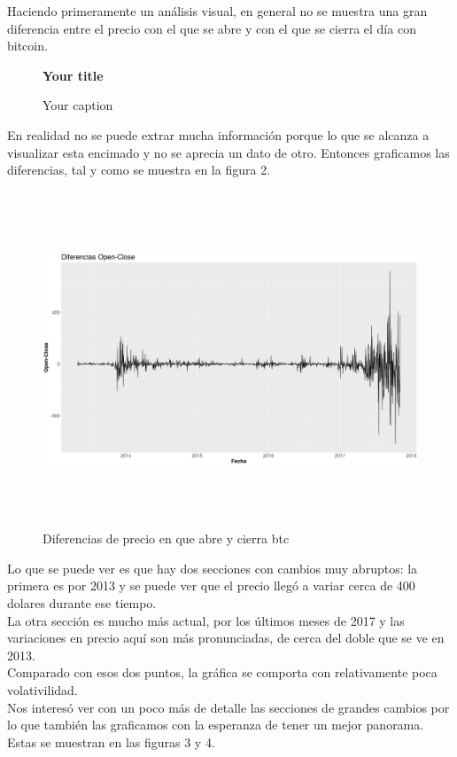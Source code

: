 \documentclass[12pt,letterpaper]{article}
\begin{document}
    Haciendo primeramente un an\'alisis visual, en general no se muestra una gran diferencia entre el precio con el que se abre y con el que se cierra el día con bitcoin.
    \\
    
    \begin{figure}
        \centering
        \textbf{Your title}\par\medskip


        \caption{Your caption}
    \end{figure}

    En realidad no se puede extrar mucha informaci\'on porque lo que se alcanza a visualizar esta encimado y no se aprecia un dato de otro. Entonces graficamos las diferencias, tal y como se muestra en la figura 2.

    \begin{figure}
        \centering

    \includegraphics[width = 18cm, height = 10cm]{btc/diferencias_BTC_OpenClose}

        \caption{Diferencias de precio en que abre y cierra btc}
    \end{figure}

    Lo que se puede ver es que hay dos secciones con cambios muy abruptos: la primera es por 2013 y se puede ver que el precio lleg\'o a variar cerca de 400 dolares durante ese tiempo.
    \\
    La otra secci\'on es mucho m\'as actual, por los \'ultimos meses de 2017 y las variaciones en precio aqu\'i son m\'as pronunciadas, de cerca del doble que se ve en 2013.
    \\
    Comparado con esos dos puntos, la gr\'afica se comporta con relativamente poca volativilidad.
    \\
    Nos interes\'o ver con un poco m\'as de detalle las secciones de grandes cambios por lo que tambi\'en las graficamos con la esperanza de tener un mejor panorama. Estas se muestran en las figuras 3 y 4.
    
\end{document}
